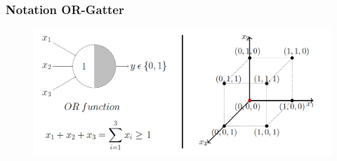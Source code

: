\begin{frame}
\frametitle{Notation OR-Gatter}

\begin{figure}
	\includegraphics[width=\linewidth]{./geschichtliches/mcCullochPittsNeuron/img/mpn_or_alpha}
\end{figure}
\end{frame}


